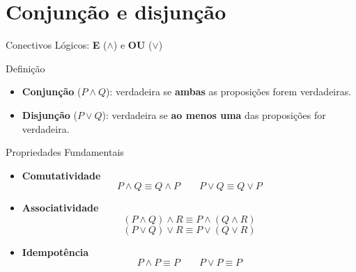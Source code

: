\documentclass[9pt]{beamer}
\begin{document}
\section{Conjunção e disjunção}
\begin{frame}{Conectivos Lógicos: \textbf{E} ($\land$) e \textbf{OU} ($\lor$)}
\Large

\begin{block}{Definição}
\begin{itemize}
    \item \textbf{Conjunção} ($P \land Q$): verdadeira se \textbf{ambas} as proposições forem verdadeiras.
    \item \textbf{Disjunção} ($P \lor Q$): verdadeira se \textbf{ao menos uma} das proposições for verdadeira.
\end{itemize}
\end{block}

\begin{block}{Propriedades Fundamentais}
\begin{itemize}
    \item \textbf{Comutatividade}
    \[
        P \land Q \equiv Q \land P
        \qquad
        P \lor Q \equiv Q \lor P
    \]

    \item \textbf{Associatividade}
    \[
        (P \land Q) \land R \equiv P \land (Q \land R)
    \]
    \[
        (P \lor Q) \lor R \equiv P \lor (Q \lor R)
    \]

    \item \textbf{Idempotência}
    \[
        P \land P \equiv P
        \qquad
        P \lor P \equiv P
    \]
\end{itemize}
\end{block}

\end{frame}
 
\end{document}
